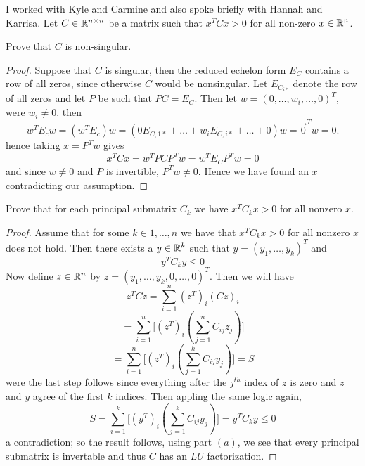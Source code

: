 



\maketitle 

I worked with Kyle and Carmine and also spoke briefly with Hannah and Karrisa. 
\question 
Let $C \in \mathbb{R}^{n \times n}$ be a matrix such that $x^TCx>0$ for all non-zero $x \in \mathbb{R}^n$. 

\begin{alphaparts}
    \questionpart 
    Prove that $C$ is non-singular. 
    
    \begin{proof}
        Suppose that $C$ is singular, then the reduced echelon form $E_C$ contains a row of 
        all zeros, since otherwise $C$ would be nonsingular. Let $E_{C_{i \ast}}$ denote the row of all zeros and 
        let $P$ be such that $PC = E_C$. Then let $w = (0, \dots, w_i, \dots, 0)^T$, were $w_i \neq 0$. 
        then 
        \[w^T E_c w = (w^T E_c) w = (0 E_{C,1 \ast} + \dots + w_i E_{C,i \ast} + \dots + 0) w = \vec{0}^T w = 0.\] 
        hence taking $x = P^T w$ gives
        \[x^TCx = w^T P C P^Tw = w^T E_C P^Tw = 0 \]
        and since $w \neq 0$ and $P$ is invertible, $P^Tw \neq 0$. Hence we have found an $x$ contradicting our assumption. 
    \end{proof}

    \questionpart 
    Prove that for each principal submatrix $C_k$ we have $x^TC_kx> 0$ for all nonzero $x$. 

    \begin{proof}
        Assume that for some $k \in 1, \dots, n$ we have that $x^T C_k x >0 $ for all nonzero $x$ does not hold. 
        Then there exists a $y \in \mathbb{R}^k$ such that $y = (y_1, \dots, y_k)^T$ and 
        \[y^T C_k y \leq 0\]
        Now define $z \in \mathbb{R}^n$ by $z = (y_1, \dots, y_k, 0, \dots, 0)^T$. 
        Then we will have 
        \[z^T C z = \sum_{i = 1}^n (z^T)_i (Cz)_i\]
        \[= \sum_{i = 1}^n \Big[(z^T)_i \left(\sum_{j= 1}^n C_{ij}z_j\right)\Big]\]
        \[= \sum_{i = 1}^n \Big[(z^T)_i \left(\sum_{j = 1}^k C_{ij} y_j\right)\Big] = S\]
        were the last step follows since everything after the $j^{th}$ index of $z$ is zero and $z$ and $y$ agree of the first $k$ indices. Then appling the same logic again,
        \[S = \sum_{i = 1}^k \Big[(y^T)_i \left(\sum_{j = 1}^k C_{ij} y_j\right)\Big] = y^TC_ky \leq 0\]
        a contradiction; so the result follows, using part $(a)$, we see that every principal submatrix is invertable and thus $C$ has an $LU$ factorization.
    \end{proof}

\end{alphaparts}


